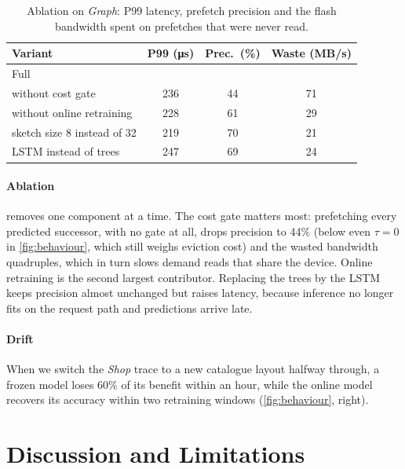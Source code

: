 \documentclass[10pt, twocolumn]{article}
\begin{document}
\begin{table}[t]
  \centering
  \caption{Ablation on \emph{Graph}: P99 latency, prefetch precision and the
  flash bandwidth spent on prefetches that were never read.}
  \label{tab:ablation}
  \footnotesize
  \begin{tabular}{@{}l S[table-format=3.0] S[table-format=2.0]
      S[table-format=3.0]@{}}
    \toprule
    Variant & {P99 (\si{\micro\second})} & {Prec.\ (\%)} & {Waste (MB/s)} \\
    \midrule
    Full \sys{}             &  &  &  \\
    without cost gate       & 236 & 44 & 71 \\
    without online retraining & 228 & 61 & 29 \\
    sketch size 8 instead of 32 & 219 & 70 & 21 \\
    LSTM instead of trees   & 247 & 69 & 24 \\
    \bottomrule
  \end{tabular}
\end{table}

\paragraph{Ablation}
 removes one component at a time. The cost gate matters
most: prefetching every predicted successor, with no gate at all, drops
precision to 44\% (below even $\tau = 0$ in \cref{fig:behaviour}, which
still weighs eviction cost) and the wasted bandwidth quadruples, which in turn slows demand reads that share the device. Online
retraining is the second largest contributor. Replacing the trees by the
LSTM keeps precision almost unchanged but raises latency, because inference
no longer fits on the request path and predictions arrive late.

\paragraph{Drift}
When we switch the \emph{Shop} trace to a new catalogue layout halfway
through, a frozen model loses 60\% of its benefit within an hour, while the
online model recovers its accuracy within two retraining windows
(\cref{fig:behaviour}, right).

\section{Discussion and Limitations}
\end{document}
